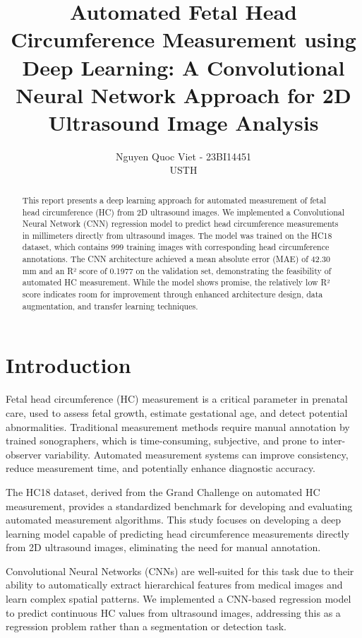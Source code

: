 \documentclass[conference]{IEEEtran}
\title{Automated Fetal Head Circumference Measurement using Deep Learning: A Convolutional Neural Network Approach for 2D Ultrasound Image Analysis}
\author{Nguyen Quoc Viet - 23BI14451\\USTH}
\begin{document}
\maketitle

\begin{abstract}
This report presents a deep learning approach for automated measurement of fetal head circumference (HC) from 2D ultrasound images. We implemented a Convolutional Neural Network (CNN) regression model to predict head circumference measurements in millimeters directly from ultrasound images. The model was trained on the HC18 dataset, which contains 999 training images with corresponding head circumference annotations. The CNN architecture achieved a mean absolute error (MAE) of 42.30 mm and an R² score of 0.1977 on the validation set, demonstrating the feasibility of automated HC measurement. While the model shows promise, the relatively low R² score indicates room for improvement through enhanced architecture design, data augmentation, and transfer learning techniques.
\end{abstract}

\section{Introduction}

Fetal head circumference (HC) measurement is a critical parameter in prenatal care, used to assess fetal growth, estimate gestational age, and detect potential abnormalities. Traditional measurement methods require manual annotation by trained sonographers, which is time-consuming, subjective, and prone to inter-observer variability. Automated measurement systems can improve consistency, reduce measurement time, and potentially enhance diagnostic accuracy.

The HC18 dataset, derived from the Grand Challenge on automated HC measurement, provides a standardized benchmark for developing and evaluating automated measurement algorithms. This study focuses on developing a deep learning model capable of predicting head circumference measurements directly from 2D ultrasound images, eliminating the need for manual annotation.

Convolutional Neural Networks (CNNs) are well-suited for this task due to their ability to automatically extract hierarchical features from medical images and learn complex spatial patterns. We implemented a CNN-based regression model to predict continuous HC values from ultrasound images, addressing this as a regression problem rather than a segmentation or detection task.
\end{document}
